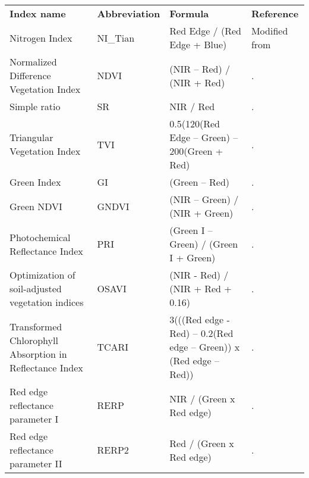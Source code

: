 \documentclass[9pt,lineno]{elife}
\begin{document}
\begin{table}[]
\begin{fullwidth}
\begin{center}
\begin{tabular}{p{3cm}p{2cm}p{4cm}p{1cm}}
\textbf{Index name }                                               & \textbf{Abbreviation} & \textbf{Formula}                                                      & \textbf{Reference}      \\
Nitrogen Index                                            & NI\_Tian     & Red Edge / (Red Edge + Blue)                                     & Modified  from \\
Normalized Difference Vegetation   Index                  & NDVI         & (NIR – Red) / (NIR + Red)                                        & .              \\
Simple ratio                                              & SR           & NIR / Red                                                        & .              \\
Triangular Vegetation Index                               & TVI          & 0.5(120(Red Edge – Green) – 200(Green    + Red)                  & .              \\
Green Index                                               & GI           & (Green – Red)                                                    & .              \\
Green NDVI                                                & GNDVI        & (NIR – Green) / (NIR + Green)                                    & .              \\
Photochemical Reflectance Index                           & PRI          & (Green I – Green) / (Green I + Green)                            & .              \\
Optimization of soil-adjusted   vegetation indices        & OSAVI        & (NIR - Red) / (NIR + Red + 0.16)                                 & .              \\
Transformed Chlorophyll Absorption   in Reflectance Index & TCARI        & 3(((Red edge - Red) – 0.2(Red edge – Green)) x (Red edge – Red)) & .              \\
Red edge reflectance parameter I                          & RERP         & NIR / (Green x Red   edge)                                       & .              \\
Red edge reflectance parameter II                         & RERP2        & Red / (Green x Red   edge)                                       & .              \\

\end{tabular}
\end{center}
\end{fullwidth}
\end{table}
\end{document}
